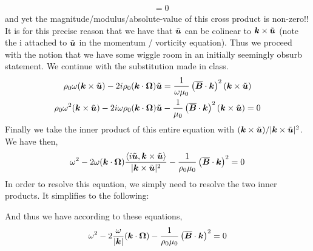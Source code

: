 \documentclass{article}
\begin{document}
\begin{enumerate}[label=\alph*.)]
\begin{align*}
        &= 0
    \end{align*}
    and yet the magnitude/modulus/absolute-value of this cross product is
    non-zero!! It is for this precise reason that we have that $\tilde{\boldsymbol{u}}$
    can be colinear to $\boldsymbol{k}\times\tilde{\boldsymbol{u}}$ (note the i attached to
    $\tilde{\boldsymbol{u}}$ in the momentum / vorticity equation). Thus we proceed with
    the notion that we have some wiggle room in an initially seemingly obsurb
    statement. We continue with the substitution made in class. 
    \begin{gather*}
        \rho_0\omega(\boldsymbol{k}\times\tilde{\boldsymbol{u}}) -
        2i\rho_0(\boldsymbol{k}\cdot\boldsymbol{\Omega})\tilde{\boldsymbol{u}} =
        \frac{1}{\omega\mu_0}\left(\overline{\boldsymbol{B}}\cdot\boldsymbol{k}\right)^2(\boldsymbol{k}\times\tilde{\boldsymbol{u}})\\
        \rho_0\omega^2(\boldsymbol{k}\times\tilde{\boldsymbol{u}}) -
        2i\omega\rho_0(\boldsymbol{k}\cdot\boldsymbol{\Omega})\tilde{\boldsymbol{u}} -
        \frac{1}{\mu_0}\left(\overline{\boldsymbol{B}}\cdot\boldsymbol{k}\right)^2(\boldsymbol{k}\times\tilde{\boldsymbol{u}})
        = 0
    \end{gather*}
    Finally we take the inner product of this entire equation with
    $(\boldsymbol{k}\times\tilde{\boldsymbol{u}})/|\boldsymbol{k}\times\tilde{\boldsymbol{u}}|^2$. We have then, 
    \begin{gather*}
        \omega^2 -
        2\omega(\boldsymbol{k}\cdot\boldsymbol{\Omega})\frac{\left<i\tilde{\boldsymbol{u}},
        \boldsymbol{k}\times\tilde{\boldsymbol{u}}\right>}{|\boldsymbol{k}\times\tilde{\boldsymbol{u}}|^2} -
        \frac{1}{\rho_0\mu_0}\left(\overline{\boldsymbol{B}}\cdot\boldsymbol{k}\right)^2
        = 0
    \end{gather*}
    In order to resolve this equation, we simply need to resolve the two inner
    products. It simplifies to the following:

    And thus we have according to these equations, 
    \begin{gather*}
        \omega^2 -
        2\frac{\omega}{|\boldsymbol{k}|}(\boldsymbol{k}\cdot\boldsymbol{\Omega}) -
        \frac{1}{\rho_0\mu_0}\left(\overline{\boldsymbol{B}}\cdot\boldsymbol{k}\right)^2
        = 0
    \end{gather*}

\end{enumerate}
\end{document}

